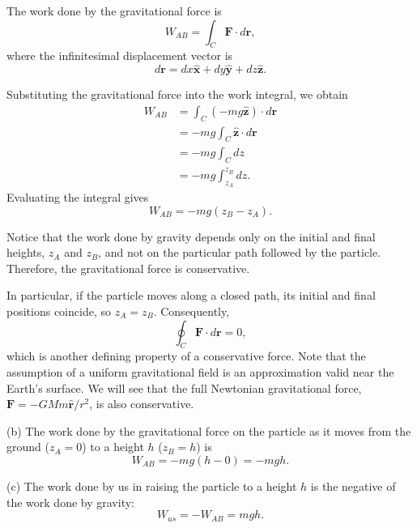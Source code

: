 \documentclass[12pt]{article}
\begin{document}
The work done by the gravitational force is
\begin{equation}
    W_{AB} = \int_C \mathbf{F}\cdot d\mathbf{r},
\end{equation}
where the infinitesimal displacement vector is
\begin{equation}
    d\mathbf{r}
    = dx\hat{\mathbf{x}}
    + dy\hat{\mathbf{y}}
    + dz\hat{\mathbf{z}}.
\end{equation}

Substituting the gravitational force into the work integral,
we obtain
\begin{equation}
\begin{aligned}
    W_{AB}
    &= \int_C (-mg\hat{\mathbf{z}})\cdot d\mathbf{r} \\
    &= -mg\int_C \hat{\mathbf{z}}\cdot d\mathbf{r} \\
    &= -mg\int_C dz \\
    &= -mg\int_{z_A}^{z_B} dz.
\end{aligned}
\end{equation}
Evaluating the integral gives
\begin{equation}
    \boxed{W_{AB} = -mg(z_B-z_A).}
\end{equation}

Notice that the work done by gravity depends only on the
initial and final heights, $z_A$ and $z_B$, and not on the
particular path followed by the particle. Therefore, the
gravitational force is conservative.

In particular, if the particle moves along a closed path,
its initial and final positions coincide, so $z_A=z_B$.
Consequently,
\begin{equation}
    \boxed{\oint_C \mathbf{F}\cdot d\mathbf{r}=0,}
\end{equation}
which is another defining property of a conservative force. Note that the assumption of a uniform gravitational field is an approximation valid near the Earth's surface. We will see that the full Newtonian gravitational force,
$\mathbf{F}=-GMm\hat{\mathbf{r}}/r^2$, is also conservative.

(b) The work done by the gravitational force on the particle as it moves from the ground ($z_A=0$) to a height $h$ ($z_B=h$) is
\begin{equation}
    W_{AB} = -mg(h-0) = -mgh.
\end{equation}

(c) The work done by us in raising the particle to a height $h$ is the negative of the work done by gravity:
\begin{equation}
    W_{us} = -W_{AB} = mgh.
\end{equation}
\end{document}
